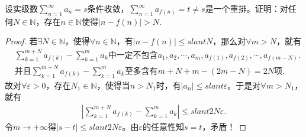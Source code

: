 \documentclass[../../main.tex]{subfiles}
\begin{document}
\begin{example}
设实级数$\sum_{n=1}^{\infty} a_n = s$条件收敛，$\sum_{n=1}^{\infty} a_{f(n)} = t \neq s$是一个重排。证明：对任何$N \in \mathbb{N}$，存在$n \in \mathbb{N}$使得$|n - f(n)| > N$.
\end{example}
\begin{proof}
若$\exists N\in \mathbb{N}$，使得$\forall n\in \mathbb{N}$，有$\left| n-f\left( n \right) \right|\leqslant slant N$，那么对$\forall m>N$，就有
\begin{align*}
&\sum_{k=1}^{m+N}{a_{f\left( k \right)}}-\sum_{k=1}^m{a_k}\text{中一定不包含}a_1,a_2,\cdots ,a_m,a_{f\left( 1 \right)},a_{f\left( 2 \right)},\cdots ,a_{f\left( m-N \right)}.
\\
&\text{并且}\sum_{k=1}^{m+N}{a_{f\left( k \right)}}-\sum_{k=1}^m{a_k}\text{至多含有}m+N+m-\left( 2m-N \right) =2N\text{项}.
\end{align*}
故对$\forall \varepsilon >0$，存在$N_1\in \mathbb{N}$，使得当$n>N_1$时，有$\left| a_n \right|\leqslant slant \varepsilon$。于是对$\forall m>N_1$，就有
\begin{align*}
\left| \sum_{k=1}^{m+N}{a_{f\left( k \right)}}-\sum_{k=1}^m{a_k} \right|\leqslant slant 2N\varepsilon.
\end{align*}
令$m\rightarrow +\infty$得$\left| s-t \right|\leqslant slant 2N\varepsilon$。由$\varepsilon$的任意性知$s=t$，矛盾！
\end{proof}
\end{document}
